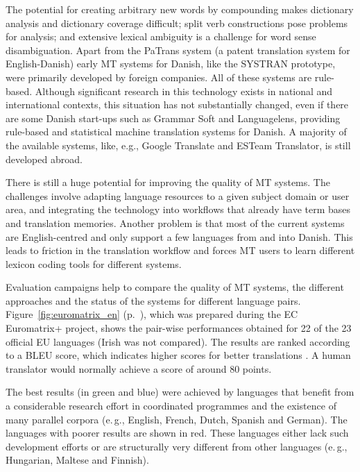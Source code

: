 \documentclass[]{../../metanetpaper}
\begin{document}
\begin{multicols}{2}
The potential for creating arbitrary new words by compounding makes dictionary analysis and dictionary coverage difficult; split verb constructions pose problems for analysis; and extensive lexical ambiguity is a challenge for word sense disambiguation.
Apart from the PaTrans system (a patent translation system for English-Danish) early MT systems for Danish, like the SYSTRAN prototype, were primarily developed by foreign companies.
All of these systems are rule-based. Although significant research in this technology exists in national and international contexts, this situation has not substantially changed, even if there are some Danish start-ups such as Grammar Soft and Languagelens, providing rule-based and statistical machine translation systems for Danish. A majority of the available systems, like, e.g., Google Translate and ESTeam Translator, is still developed abroad.

There is still a huge potential for improving the quality of MT systems. The challenges involve adapting language resources to a given subject domain or user area, and integrating the technology into workflows that already have term bases and translation memories. Another problem is that most of the current systems are English-centred and only support a few languages from and into Danish. This leads to friction in the translation workflow and forces MT users to learn different lexicon coding tools for different systems.

Evaluation campaigns help to compare the quality of MT systems, the different approaches and the status of the systems for different language pairs. Figure~\ref{fig:euromatrix_en} (p.~\pageref{fig:euromatrix_en}), which was prepared during the EC Euromatrix+ project, shows the pair-wise performances obtained for 22 of the 23 official EU languages (Irish was not compared). The results are ranked according to a BLEU score, which indicates higher scores for better translations \cite{bleu1}. A human translator would normally achieve a score of around 80 points.

The best results (in green and blue) were achieved by languages that benefit from a considerable research effort in coordinated programmes and the existence of many parallel corpora (e.\,g., English, French, Dutch, Spanish and German). The languages with poorer results are shown in red. These languages either lack such development efforts or are structurally very different from other languages (e.\,g., Hungarian, Maltese and Finnish).


\end{multicols}
\end{document}
